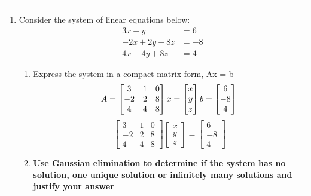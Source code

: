 \documentclass[11pt]{article}
\begin{document}
\Large




\medskip\hrule
\begin{enumerate}

\item Consider the system of linear equations below:
\[
\begin{aligned}
    3x + y &= 6 \\
    -2x + 2y + 8z &= -8 \\
    4x + 4y + 8z &= 4
\end{aligned}
\]

\begin{enumerate}
    \item Express the system in a compact matrix form, Ax = b 
    \[
        A = \begin{bmatrix}
            3 & 1 & 0 \\
            -2 & 2 & 8 \\
            4 & 4 & 8
        \end{bmatrix}
        x = \begin{bmatrix}
            x \\
            y \\
            z
        \end{bmatrix}
        b = \begin{bmatrix}
            6 \\
            -8 \\
            4
        \end{bmatrix}\newline
    \]  
    \[
        \begin{bmatrix}
            3 & 1 & 0 \\
            -2 & 2 & 8 \\
            4 & 4 & 8
        \end{bmatrix}
        \begin{bmatrix}
            x \\
            y \\
            z
        \end{bmatrix}
        = \begin{bmatrix}
            6 \\
            -8 \\
            4
        \end{bmatrix}
    \]
    \item \textbf{Use Gaussian elimination to determine if the system has no solution, one unique solution or infinitely many solutions and justify your answer}

\end{enumerate}
\end{enumerate}
\end{document}
